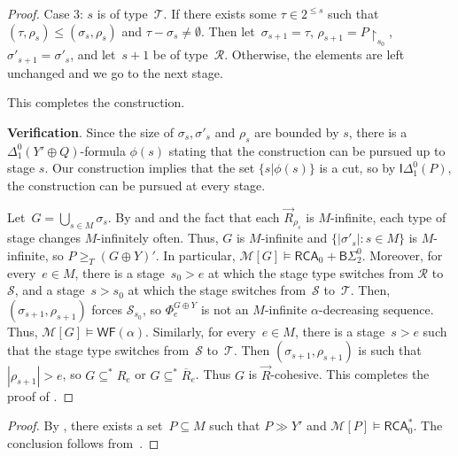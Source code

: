 \documentclass{article}
\numberwithin{theorem}{section}
\newtheorem{corollary}[theorem]{Corollary}
\newcommand{\RCA}{\mathsf{RCA}}
\newcommand{\BSig}{\mathsf{B}\Sigma^0}
\newcommand{\IDel}{\mathsf{I}\Delta^0}
\newcommand{\WF}{\mathsf{WF}}
\newcommand{\R}{\mathcal{R}}
\renewcommand{\S}{\mathcal{S}}
\newcommand{\T}{\mathcal{T}}
\newcommand{\M}{\mathcal{M}}
\newcommand{\uh}[0]{{\upharpoonright}}
\begin{document}
\begin{proof}
Case 3: $s$ is of type~$\T$. If there exists some $\tau \in 2^{\leq s}$ such that $(\tau, \rho_s) \leq (\sigma_s, \rho_s)$ and $\tau - \sigma_s \neq \emptyset$. Then let~$\sigma_{s+1} = \tau$, $\rho_{s+1} = P \uh_{s_0}$, $\sigma'_{s+1} = \sigma'_s$, and let~$s+1$ be of type~$\R$. Otherwise, the elements are left unchanged and we go to the next stage.

This completes the construction.
\bigskip

\textbf{Verification}.
Since the size of $\sigma_s, \sigma'_s$ and $\rho_s$ are bounded by $s$, there is a $\Delta_1^0(Y' \oplus Q)$-formula $\phi(s)$ stating that the construction can be pursued up to stage $s$. Our construction implies that the set $\{s|\phi(s)\}$ is a cut, so by $\IDel_1(P)$, the construction can be pursued at every stage. 

Let~$G = \bigcup_{s \in M} \sigma_s$.
By  and  and the fact that each $\vec{R}_{\rho_s}$ is $M$-infinite,
each type of stage changes $M$-infinitely often. Thus, $G$ is $M$-infinite and $\{|\sigma'_s| : s \in M \}$ is $M$-infinite, so $P \geq_T (G \oplus Y)'$. In particular, $\M[G] \models \RCA_0 + \BSig_2$. Moreover, for every~$e \in M$, there is a stage~$s_0 > e$ at which the stage type switches from $\R$ to $\S$, and a stage~$s > s_0$ at which the stage switches from~$\S$ to~$\T$.
Then, $(\sigma_{s+1}, \rho_{s+1})$ forces $\S_{s_0}$, so $\Phi^{G \oplus Y}_e$ is not an $M$-infinite $\alpha$-decreasing sequence. Thus, $\M[G] \models \WF(\alpha)$.
Similarly, for every~$e \in M$, there is a stage~$s > e$ such that the stage type switches from~$\S$ to~$\T$. Then $(\sigma_{s+1}, \rho_{s+1})$ is such that $|\rho_{s+1}| > e$, so $G \subseteq^{*} R_e$ or $G \subseteq^{*} \overline{R}_e$. Thus $G$ is $\vec{R}$-cohesive. This completes the proof of .
\end{proof}

\begin{proof}
By , there exists a set~$P \subseteq M$ such that $P \gg Y'$ and $\M[P] \models \RCA_0^*$.
The conclusion follows from~.
\end{proof}
\end{document}
